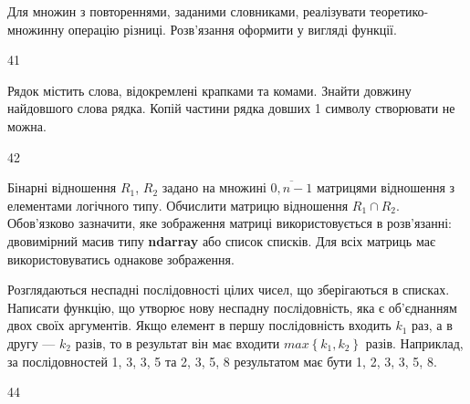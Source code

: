 Для множин з повтореннями, заданими словниками, реалізувати теоретико-множинну операцію різниці. Розв’язання оформити у вигляді функції.
\\\par
41 














Рядок містить слова, відокремлені крапками та комами. Знайти довжину найдовшого слова рядка. Копій частини рядка довших 1 символу створювати не можна.
\\\par
42 














Бінарні відношення $R_1$, $R_2$ задано на множині $\overline{0,n-1}$ матрицями відношення з елементами логічного типу. Обчислити матрицю відношення $R_1\cap R_2$. Обов'язково зазначити, яке зображення матриці використовується в розв'язанні: двовимірний масив типу \textbf{ndarray} або список списків. Для всіх матриць має використовуватись однакове зображення.
\\\par
{} 














Розглядаються неспадні послідовності цілих чисел, що зберігаються в списках. Написати функцію, що утворює нову неспадну послідовність, яка є об'єднанням двох своїх аргументів. Якщо елемент в першу послідовність входить $k_1$ раз, а в другу --- $k_2$ разів, то в результат він має входити $max\left\{k_1,k_2\right\}$ разів. Наприклад, за послідовностей 1, 3, 3, 5 та 2, 3, 5, 8 результатом має бути 1, 2, 3, 3, 5, 8.
\\\par
44 














